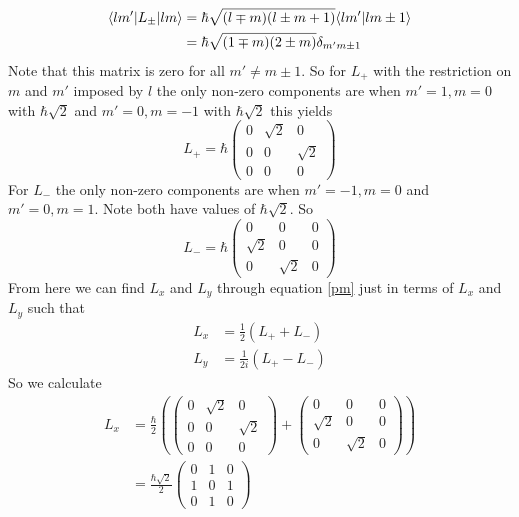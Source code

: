 \documentclass[11pt]{article}
\numberwithin{equation}{section}
\begin{document}
\begin{align*}
\langle{lm'}|L_{\pm}|{lm}\rangle &= \hbar\sqrt{(l\mp m)(l\pm m+1)}\langle{lm'}|{lm\pm1}\rangle\\
&= \hbar\sqrt{(1\mp m)(2\pm m)}\delta_{m'm\pm1}
\end{align*}
Note that this matrix is zero for all $m'\ne m\pm1$. So for $L_{+}$ with the restriction on $m$ and $m'$ imposed by $l$ the only non-zero components are when $m'=1,m=0$ with $\hbar\sqrt{2}$ and $m'=0,m=-1$ with $\hbar\sqrt{2}$ this yields
\begin{equation}
L_+ = \hbar\left(\begin{array}{ccc}
                 0    &\sqrt{2}   &0\\
                 0    &0   &\sqrt{2}\\
                 0    &0   &0
           \end{array}\right)
\label{Lp}
\end{equation}
For $L_-$ the only non-zero components are when $m'=-1,m=0$ and $m'=0,m=1$. Note both have values of $\hbar\sqrt{2}$. So
\begin{equation}
L_- = \hbar\left(\begin{array}{ccc}
                 0    &0   &0 \\
                 \sqrt{2}    &0   &0\\
                 0    &\sqrt{2}   &0
           \end{array}\right)
\label{Lp}
\end{equation}
From here we can find $L_x$ and $L_y$ through equation \ref{pm} just in terms of $L_x$ and $L_y$ such that
\begin{align*}
L_x &= \frac{1}{2}(L_++L_-)\\
L_y &= \frac{1}{2i}(L_+-L_-)
\end{align*}
So we calculate
\begin{align*}
L_x &= \frac{\hbar}{2}\left(
   \left(\begin{array}{ccc}
         0    &\sqrt{2}   &0\\
         0    &0   &\sqrt{2}\\
         0    &0   &0
   \end{array}\right)
+  \left(\begin{array}{ccc}
         0    &0   &0 \\
         \sqrt{2}    &0   &0\\
         0    &\sqrt{2}   &0
         \end{array}\right)\right)\\
&= \frac{\hbar\sqrt{2}}{2}
   \left(\begin{array}{ccc}
         0    &1   &0\\
         1    &0   &1\\
         0    &1   &0
   \end{array}\right)
\end{align*}
\end{document}

